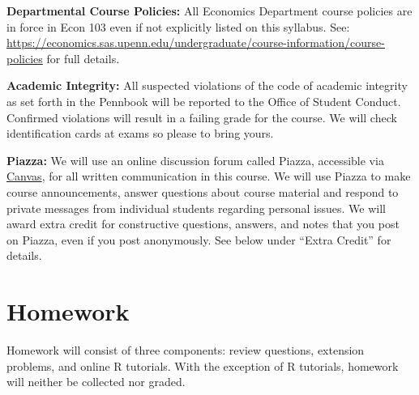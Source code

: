 \documentclass[11pt, letterpaper]{article}
\begin{document}
\newpage

\noindent \textbf{Departmental Course Policies: } 
All Economics Department course policies are in force in Econ 103 even if not explicitly listed on this syllabus. 
See: \url{https://economics.sas.upenn.edu/undergraduate/course-information/course-policies} for full details.

\medskip


\noindent \textbf{Academic Integrity: } 
All suspected violations of the code of academic integrity as set forth in the Pennbook will be reported to the Office of Student Conduct. 
Confirmed violations will result in a failing grade for the course. 
We will check identification cards at exams so please to bring yours.

\medskip

\noindent \textbf{Piazza:} 
We will use an online discussion forum called Piazza, accessible via \href{http://upenn.instructure.com}{Canvas}, for all written communication in this course.
We will use Piazza to make course announcements, answer questions about course material and respond to private messages from individual students regarding personal issues.
We will award extra credit for constructive questions, answers, and notes that you post on Piazza, even if you post anonymously.
See below under ``Extra Credit'' for details.

\section*{Homework}
Homework will consist of three components: review questions, extension problems, and online R tutorials. 
With the exception of R tutorials, homework will neither be collected nor graded.
\end{document}
